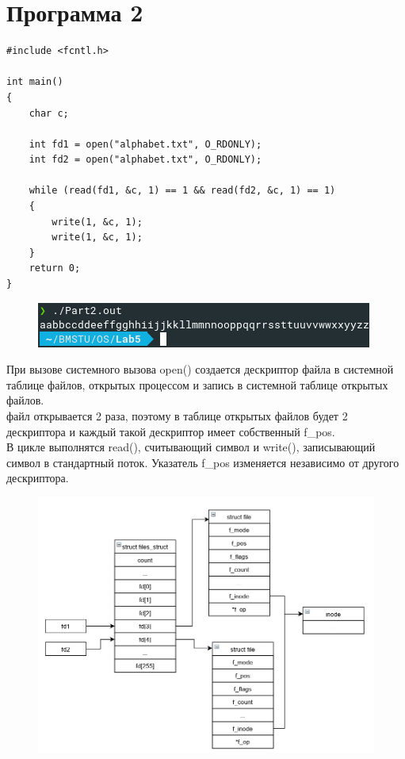 \documentclass[14pt, a4paper]{extarticle}
\begin{document}
\section*{Программа 2}
\begin{lstlisting}
#include <fcntl.h>

int main()
{
	char c;
	
	int fd1 = open("alphabet.txt", O_RDONLY);
	int fd2 = open("alphabet.txt", O_RDONLY);
	
	while (read(fd1, &c, 1) == 1 && read(fd2, &c, 1) == 1)
	{
		write(1, &c, 1);
		write(1, &c, 1);
	}
	return 0;
}
\end{lstlisting}
\begin{figure}[h!]
	\includegraphics[scale=1]{source/Part2.png}
\end{figure}
При вызове системного вызова open() создается дескриптор файла в системной таблице файлов, открытых процессом и запись в системной таблице открытых файлов. \\
файл открывается 2 раза, поэтому в таблице открытых файлов будет 2 дескриптора и каждый такой дескриптор имеет собственный f\_pos.\\
В цикле выполнятся read(), считывающий символ и write(), записывающий символ в стандартный поток. Указатель f\_pos изменяется независимо от другого дескриптора.
\begin{figure}[h!]
	\includegraphics[scale=0.60]{source/diag2.jpg}
\end{figure}
\newpage
\end{document}
